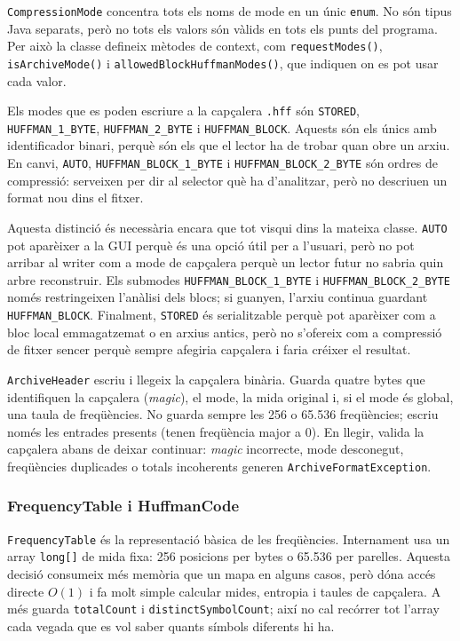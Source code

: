 \documentclass[conference,compsoc]{IEEEtran}
\begin{document}
\texttt{CompressionMode} concentra tots els noms de mode en un únic
\texttt{enum}. No són tipus Java separats, però no tots els valors són
vàlids en tots els punts del programa. Per això la classe defineix
mètodes de context, com \texttt{requestModes()}, \texttt{isArchiveMode()}
i \texttt{allowedBlockHuffmanModes()}, que indiquen on es pot usar cada
valor.

Els modes que es poden escriure a la capçalera \texttt{.hff} són
\texttt{STORED}, \texttt{HUFFMAN\_1\_BYTE}, \texttt{HUFFMAN\_2\_BYTE} i
\texttt{HUFFMAN\_BLOCK}. Aquests són els únics amb identificador binari,
perquè són els que el lector ha de trobar quan obre un arxiu. En canvi,
\texttt{AUTO}, \texttt{HUFFMAN\_BLOCK\_1\_BYTE} i
\texttt{HUFFMAN\_BLOCK\_2\_BYTE} són ordres de compressió: serveixen per
dir al selector què ha d'analitzar, però no descriuen un format nou dins
el fitxer.

Aquesta distinció és necessària encara que tot visqui dins la mateixa
classe. \texttt{AUTO} pot aparèixer a la GUI perquè és una opció útil per
a l'usuari, però no pot arribar al writer com a mode de capçalera perquè
un lector futur no sabria quin arbre reconstruir. Els submodes
\texttt{HUFFMAN\_BLOCK\_1\_BYTE} i
\texttt{HUFFMAN\_BLOCK\_2\_BYTE} només restringeixen l'anàlisi dels blocs;
si guanyen, l'arxiu continua guardant \texttt{HUFFMAN\_BLOCK}. Finalment,
\texttt{STORED} és serialitzable perquè pot aparèixer com a bloc local
emmagatzemat o en arxius antics, però no s'ofereix com a compressió de
fitxer sencer perquè sempre afegiria capçalera i faria créixer el
resultat.

\texttt{ArchiveHeader} escriu i llegeix la capçalera binària. Guarda
quatre bytes que identifiquen la capçalera (\textit{magic}), el mode, la mida original i, si el mode és global,
una taula de freqüències. No guarda sempre les 256 o 65.536 freqüències;
escriu només les entrades presents (tenen freqüència major a 0). En llegir, valida la
capçalera abans de deixar continuar: \textit{magic} incorrecte, mode desconegut,
freqüències duplicades o totals incoherents generen
\texttt{ArchiveFormatException}.

\subsubsection{FrequencyTable i HuffmanCode}

\texttt{FrequencyTable} és la representació bàsica de les freqüències.
Internament usa un array \texttt{long[]} de mida fixa: 256 posicions per
bytes o 65.536 per parelles. Aquesta decisió consumeix més memòria que un
mapa en alguns casos, però dóna accés directe $O(1)$ i fa molt
simple calcular mides, entropia i taules de capçalera. A més guarda
\texttt{totalCount} i \texttt{distinctSymbolCount}; així no cal recórrer
tot l'array cada vegada que es vol saber quants símbols diferents hi ha.
\end{document}

